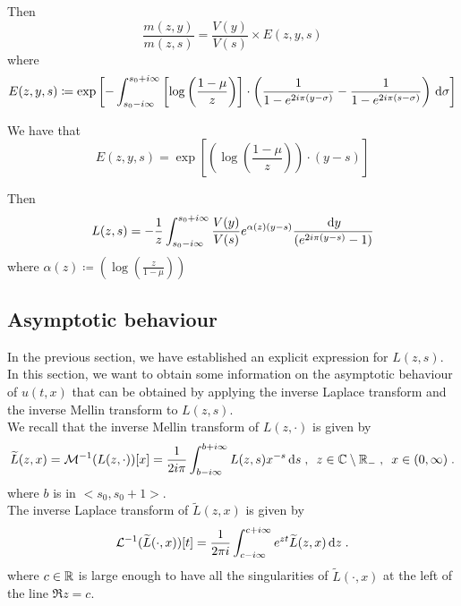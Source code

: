 Then 
\begin{equation*}
    \frac{m(z,y)}{m(z,s)} 
    = 
    \frac{V(y)}{V(s)} \times E(z,y,s)
\end{equation*}
where $$E(z,y,s) \coloneqq \exp \left[
    - \int_{s_0-i\infty}^{s_0+i\infty} \left[\log \left( \frac{1-\mu}{z}\right) \right]
    \cdot \left(
        \frac{1}{1-e^{2i\pi(y-\sigma)}} - \frac{1}{1-e^{2i\pi(s-\sigma)}}
     \right) \,\mathrm{d} \sigma \right]
     $$

We have that
\begin{equation*}
    E(z,y,s) 
    = 
    \exp
        \left[
     \left(\log \left( \frac{1-\mu}{z}\right) \right)
    \cdot (y-s)\right]
\end{equation*}

Then 
\begin{equation}
    \label{ARMA3.30}
    L(z,s) 
    = 
   - \frac{1}{z}\int_{s_0-i\infty}^{s_0+i\infty} \frac{V(y)}{V(s)} e^{ \alpha(z)(y-s)}
   \frac{\,\mathrm{d} y}{(e^{2i\pi(y-s)}-1)}
\end{equation}
where $\alpha(z) \coloneqq  
    \left(\log \left( \frac{z}{1-\mu}\right)\right)$
\subsection{Asymptotic behaviour} In the previous section, we have established an explicit expression for $L(z,s)$. In this section, we want to obtain some information on the asymptotic behaviour of $u(t,x)$ that can be obtained by applying the inverse Laplace transform and the inverse Mellin transform to $L(z,s)$. \\

We recall that the inverse Mellin transform of $L(z,\cdot)$ is given by 
\begin{equation*}
    \widetilde{L}(z,x) = \mathcal{M}^{-1}(L(z, \cdot))[x] = \frac{1}{2i\pi} \int_{b-i\infty}^{b+i\infty} L(z,s)x^{-s}\,\mathrm{d} s
    \; , \enspace
    z \in \mathbb{C} \setminus \mathbb{R}_-
    \; , \enspace x \in (0, \infty)
    \; .
\end{equation*}
where $b$ is in $<s_0, s_0+1>$.\\
The inverse Laplace transform of $\tilde{L}(z,x)$ is given by 
\begin{equation*}
     \mathcal{L}^{-1}(\widetilde L(\cdot, x))[t] 
     = \frac{1}{2\pi i} \int_{c-i\infty}^{c+i\infty} e^{zt}\widetilde L(z,x) \,\mathrm{d} z
     \; .
\end{equation*}
where $c \in \mathbb{R}$ is large enough to have all the singularities of $\tilde L(\cdot,x)$ at the left of the line $\Re z = c$. 
\medskip

